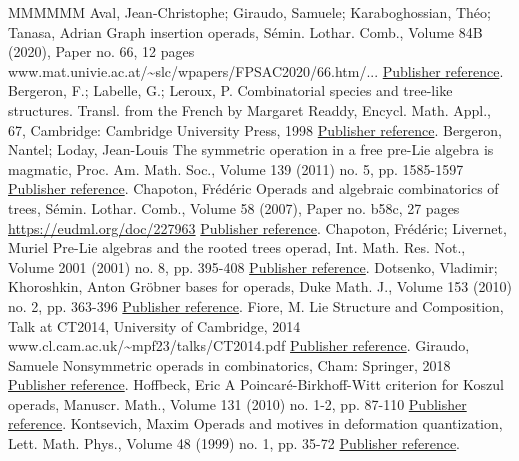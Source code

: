 \documentclass[11pt]{article}
\theoremstyle{definition}
\numberwithin{equation}{section}
\begin{document}
\begin{thebibliography}{MMMMMM}
 Aval, Jean-Christophe; Giraudo, Samuele; Karaboghossian, Théo; Tanasa, Adrian Graph insertion operads, Sémin. Lothar. Comb., Volume 84B (2020), Paper no. 66, 12 pages www.mat.univie.ac.at/\textasciitilde{}slc/wpapers/FPSAC2020/66.htm/... \href{https://alco.centre-mersenne.org/articles/10.5802/alco.442/#AGKT20}{Publisher reference}.
 Bergeron, F.; Labelle, G.; Leroux, P. Combinatorial species and tree-like structures. Transl. from the French by Margaret Readdy, Encycl. Math. Appl., 67, Cambridge: Cambridge University Press, 1998 \href{https://alco.centre-mersenne.org/articles/10.5802/alco.442/#BLL98}{Publisher reference}.
 Bergeron, Nantel; Loday, Jean-Louis The symmetric operation in a free pre-Lie algebra is magmatic, Proc. Am. Math. Soc., Volume 139 (2011) no. 5, pp. 1585-1597 \href{https://alco.centre-mersenne.org/articles/10.5802/alco.442/#BL11}{Publisher reference}.
 Chapoton, Frédéric Operads and algebraic combinatorics of trees, Sémin. Lothar. Comb., Volume 58 (2007), Paper no. b58c, 27 pages \url{https://eudml.org/doc/227963} \href{https://alco.centre-mersenne.org/articles/10.5802/alco.442/#CSLC}{Publisher reference}.
 Chapoton, Frédéric; Livernet, Muriel Pre-Lie algebras and the rooted trees operad, Int. Math. Res. Not., Volume 2001 (2001) no. 8, pp. 395-408 \href{https://alco.centre-mersenne.org/articles/10.5802/alco.442/#CL01}{Publisher reference}.
 Dotsenko, Vladimir; Khoroshkin, Anton Gröbner bases for operads, Duke Math. J., Volume 153 (2010) no. 2, pp. 363-396 \href{https://alco.centre-mersenne.org/articles/10.5802/alco.442/#DK10}{Publisher reference}.
 Fiore, M. Lie Structure and Composition, Talk at CT2014, University of Cambridge, 2014 www.cl.cam.ac.uk/\textasciitilde{}mpf23/talks/CT2014.pdf \href{https://alco.centre-mersenne.org/articles/10.5802/alco.442/#F14}{Publisher reference}.
 Giraudo, Samuele Nonsymmetric operads in combinatorics, Cham: Springer, 2018 \href{https://alco.centre-mersenne.org/articles/10.5802/alco.442/#Gir18}{Publisher reference}.
 Hoffbeck, Eric A Poincaré-Birkhoff-Witt criterion for Koszul operads, Manuscr. Math., Volume 131 (2010) no. 1-2, pp. 87-110 \href{https://alco.centre-mersenne.org/articles/10.5802/alco.442/#Hof10}{Publisher reference}.
 Kontsevich, Maxim Operads and motives in deformation quantization, Lett. Math. Phys., Volume 48 (1999) no. 1, pp. 35-72 \href{https://alco.centre-mersenne.org/articles/10.5802/alco.442/#Kon99}{Publisher reference}.

\end{thebibliography}
\end{document}
